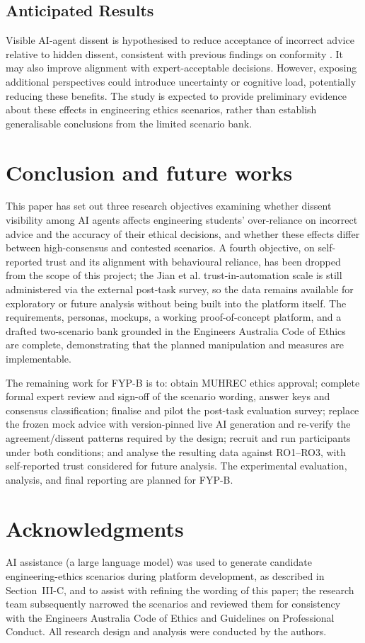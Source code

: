 \documentclass[conference]{IEEEtran}
\begin{document}
\subsection{Anticipated Results}
Visible AI-agent dissent is hypothesised to reduce acceptance of incorrect advice relative to hidden dissent, consistent with previous findings on conformity \cite{tsuchiya2026multiaiadvice}. It may also improve alignment with expert-acceptable decisions. However, exposing additional perspectives could introduce uncertainty or cognitive load, potentially reducing these benefits. The study is expected to provide preliminary evidence about these effects in engineering ethics scenarios, rather than establish generalisable conclusions from the limited scenario bank.

\section{Conclusion and future works}

This paper has set out three research objectives examining whether dissent visibility among AI agents affects engineering students' over-reliance on incorrect advice and the accuracy of their ethical decisions, and whether these effects differ between high-consensus and contested scenarios. A fourth objective, on self-reported trust and its alignment with behavioural reliance, has been dropped from the scope of this project; the Jian et al. trust-in-automation scale is still administered via the external post-task survey, so the data remains available for exploratory or future analysis without being built into the platform itself. The requirements, personas, mockups, a working proof-of-concept platform, and a drafted two-scenario bank grounded in the Engineers Australia Code of Ethics are complete, demonstrating that the planned manipulation and measures are implementable.

The remaining work for FYP-B is to: obtain MUHREC ethics approval; complete formal expert review and sign-off of the scenario wording, answer keys and consensus classification; finalise and pilot the post-task evaluation survey; replace the frozen mock advice with version-pinned live AI generation and re-verify the agreement/dissent patterns required by the design; recruit and run participants under both conditions; and analyse the resulting data against RO1--RO3, with self-reported trust considered for future analysis. The experimental evaluation, analysis, and final reporting are planned for FYP-B.

\section{Acknowledgments}

AI assistance (a large language model) was used to generate candidate engineering-ethics scenarios during platform development, as described in Section~III-C, and to assist with refining the wording of this paper; the research team subsequently narrowed the scenarios and reviewed them for consistency with the Engineers Australia Code of Ethics and Guidelines on Professional Conduct. All research design and analysis were conducted by the authors.


 
\end{document}
